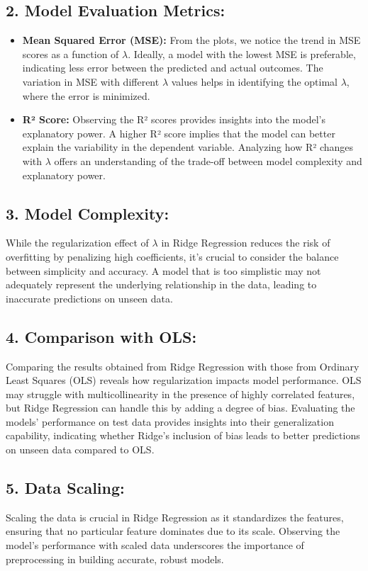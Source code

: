 \documentclass{article}
\begin{document}
\subsection*{2. Model Evaluation Metrics:}
\begin{itemize}[label={--}]
    \item \textbf{Mean Squared Error (MSE):} From the plots, we notice the trend in MSE scores as a function of $\lambda$. Ideally, a model with the lowest MSE is preferable, indicating less error between the predicted and actual outcomes. The variation in MSE with different $\lambda$ values helps in identifying the optimal $\lambda$, where the error is minimized.
    \item \textbf{R² Score:} Observing the R² scores provides insights into the model's explanatory power. A higher R² score implies that the model can better explain the variability in the dependent variable. Analyzing how R² changes with $\lambda$ offers an understanding of the trade-off between model complexity and explanatory power.

    
\end{itemize}

\subsection*{3. Model Complexity:}
While the regularization effect of $\lambda$ in Ridge Regression reduces the risk of overfitting by penalizing high coefficients, it’s crucial to consider the balance between simplicity and accuracy. A model that is too simplistic may not adequately represent the underlying relationship in the data, leading to inaccurate predictions on unseen data.

\subsection*{4. Comparison with OLS:}
Comparing the results obtained from Ridge Regression with those from Ordinary Least Squares (OLS) reveals how regularization impacts model performance. OLS may struggle with multicollinearity in the presence of highly correlated features, but Ridge Regression can handle this by adding a degree of bias. Evaluating the models’ performance on test data provides insights into their generalization capability, indicating whether Ridge’s inclusion of bias leads to better predictions on unseen data compared to OLS.

\subsection*{5. Data Scaling:}
Scaling the data is crucial in Ridge Regression as it standardizes the features, ensuring that no particular feature dominates due to its scale. Observing the model’s performance with scaled data underscores the importance of preprocessing in building accurate, robust models.
\end{document}
